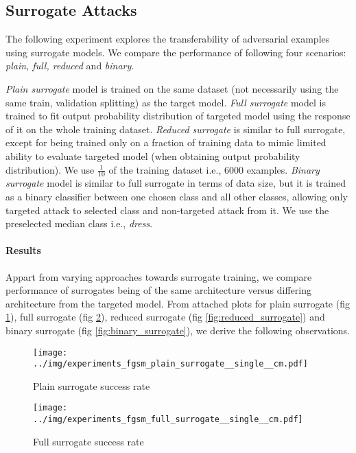 \subsection{Surrogate Attacks}
\label{sec:surrogate_fgsm}
The following experiment explores the transferability of adversarial examples using surrogate models. We compare the performance of following four scenarios: \emph{plain, full, reduced} and \emph{binary}.

\emph{Plain surrogate} model is trained on the same dataset (not necessarily using the same train, validation splitting) as the target model. \emph{Full surrogate} model is trained to fit output probability distribution of targeted model using the response of it on the whole training dataset. \emph{Reduced surrogate} is similar to full surrogate, except for being trained only on a fraction of training data to mimic limited ability to evaluate targeted model (when obtaining output probability distribution). We use $\frac{1}{10}$ of the training dataset i.e., 6000 examples. \emph{Binary surrogate} model is similar to full surrogate in terms of data size, but it is trained as a binary classifier between one chosen class and all other classes, allowing only targeted attack to selected class and non-targeted attack from it. We use the preselected median class i.e., \emph{dress}.

\paragraph{Results}
Appart from varying approaches towards surrogate training, we compare performance of surrogates being of the same architecture versus differing architecture from the targeted model. From attached plots for plain surrogate (fig \ref{fig:plain_surrogate}), full surrogate (fig \ref{fig:full_surrogate}), reduced surrogate (fig \ref{fig:reduced_surrogate}) and binary surrogate (fig \ref{fig:binary_surrogate}), we derive the following observations.

\begin{figure}
    \centering
    \texttt{[image: ../img/experiments\_fgsm\_plain\_surrogate\_\_single\_\_cm.pdf]}
    \caption{Plain surrogate success rate}
    \label{fig:plain_surrogate}
\end{figure}

\begin{figure}
    \centering
    \texttt{[image: ../img/experiments\_fgsm\_full\_surrogate\_\_single\_\_cm.pdf]}
    \caption{Full surrogate success rate}
    \label{fig:full_surrogate}
\end{figure}

